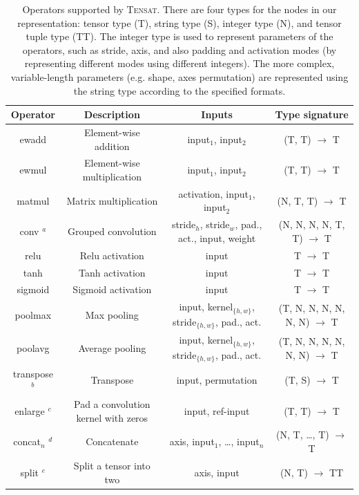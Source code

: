 \documentclass{article}
\newcommand{\ourname}[0]{\textsc{Tensat}}
\begin{document}
\begin{table}[t]
    \small
    {\centering
    \caption{Operators supported by \ourname. 
    There are four types for the nodes in our representation: 
    tensor type (T), string type (S), integer type (N), and tensor tuple type (TT).
    The integer type is used to represent parameters of the operators, such as stride, axis, and also padding and activation modes (by representing different modes using different integers). 
    The more complex, variable-length parameters (e.g. shape, axes permutation) are represented using the string type according to the specified formats. }
    \label{table:ops}
    \begin{tabular}{cccc}
    \toprule
        {\bf Operator} & {\bf Description} & {\bf Inputs} & {\bf Type signature} \\
    \midrule
        ewadd & Element-wise addition & input$_1$, input$_2$ & (T, T) $\rightarrow$ T  \\
        ewmul & Element-wise multiplication & input$_1$, input$_2$ & (T, T) $\rightarrow$ T \\
        matmul & Matrix multiplication & activation, input$_1$, input$_2$ & (N, T, T) $\rightarrow$ T \\
        conv $^a$ & Grouped convolution & stride$_h$, stride$_w$, pad., act., input, weight & (N, N, N, N, T, T) $\rightarrow$ T \\
        relu & Relu activation & input & T $\rightarrow$ T \\
        tanh & Tanh activation & input & T $\rightarrow$ T \\
        sigmoid & Sigmoid activation & input & T $\rightarrow$ T \\
        poolmax & Max pooling & {input, kernel$_{\{h,w\}}$, stride$_{\{h,w\}}$, pad., act.}  & (T, N, N, N, N, N, N) $\rightarrow$ T \\
        poolavg & Average pooling & {input, kernel$_{\{h,w\}}$, stride$_{\{h,w\}}$, pad., act.} & (T, N, N, N, N, N, N) $\rightarrow$ T \\
        transpose $^b$ & Transpose & input, permutation & (T, S) $\rightarrow$ T \\
        enlarge $^c$ & Pad a convolution kernel with zeros & input, ref-input & (T, T) $\rightarrow$ T \\
        concat$_n$ $^d$ & Concatenate & axis, input$_1$, \dots, input$_n$ & (N, T, \dots, T) $\rightarrow$ T \\
        split $^e$ & Split a tensor into two & axis, input & (N, T) $\rightarrow$ TT \\

\end{tabular}}
\end{table}
\end{document}

